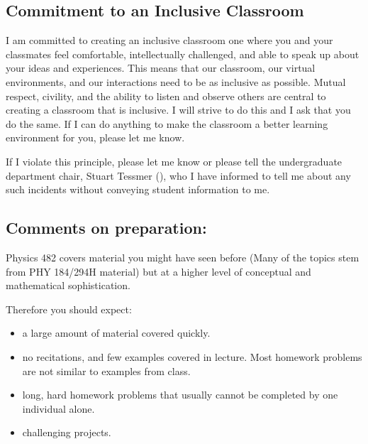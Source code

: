 \documentclass[letterpaper,10pt,english]{jupyterBook}
\begin{document}
\subsection{Commitment to an Inclusive Classroom}
\label{\detokenize{content/0_course/environment:commitment-to-an-inclusive-classroom}}
\sphinxAtStartPar
I am committed to creating an inclusive classroom \sphinxhyphen{} one where you and your classmates
feel comfortable, intellectually challenged, and able to speak up about your ideas
and experiences. This means that our classroom, our virtual environments, and our interactions
need to be as inclusive as possible. Mutual respect, civility, and the ability to listen
and observe others are central to creating a classroom that is inclusive. I will strive to
do this and I ask that you do the same. If I can do anything to make the classroom a better
learning environment for you, please let me know.

\sphinxAtStartPar
{}

\sphinxAtStartPar
If I violate this principle, please let me know
or please tell the undergraduate department chair,
Stuart Tessmer (), who I have informed to tell me about any such incidents
without conveying student information to me.


\subsection{Comments on preparation:}
\label{\detokenize{content/0_course/environment:comments-on-preparation}}
\sphinxAtStartPar
Physics 482 covers material you might have seen before (Many of the topics
stem from PHY 184/294H material) but at a higher level of conceptual and
mathematical sophistication.

\sphinxAtStartPar
Therefore you should expect:
\begin{itemize}
\item {} 
\sphinxAtStartPar
a large amount of material covered quickly.

\item {} 
\sphinxAtStartPar
no recitations, and few examples covered in lecture. Most homework
problems are not similar to examples from class.

\item {} 
\sphinxAtStartPar
long, hard homework problems that usually cannot be completed by one
individual alone.

\item {} 
\sphinxAtStartPar
challenging projects.

\end{itemize}
\end{document}
